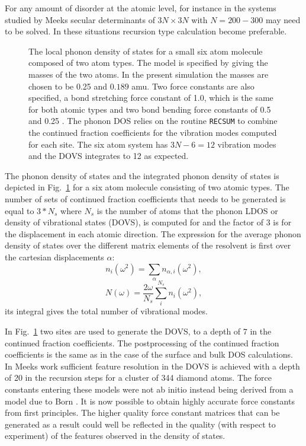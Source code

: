 For any amount of disorder at the atomic level, for instance in the systems 
studied by Meeks secular determinants of $3N\times3N$ with
$N=200-300$ may need to be solved. In these situations recursion 
type calculation become preferable. \cite{dean92}
%
\begin{figure}
\begin{center}
{\graphicspath{{./invariance/rec_examples/phonon/}}}
\caption{The local phonon density of states for a small six atom molecule 
composed of two atom types. The model is specified by giving the 
masses of the two atoms. In the present simulation 
the masses are chosen to be 0.25 and $0.189$ amu. Two force constants are also
specified, a bond stretching force constant of 1.0, 
which is the same for both atomic types
and two bond bending force constants of 0.5 and 0.25 \label{fig:phonondos}. 
The phonon DOS relies on the routine
\texttt{RECSUM} to combine the continued fraction coefficients 
for the vibration modes computed for each site. 
The six atom system has $3N-6=12$ vibration modes and the 
DOVS integrates to 12 as expected.}
\end{center}
\end{figure}
%
The phonon density of states and the integrated phonon density of 
states is depicted in Fig.~\ref{fig:phonondos} 
for a six atom molecule consisting of two atomic types. The number of 
sets of continued fraction coefficients
that needs to be generated is equal to $3*N_{s}$ where $N_{s}$ 
is the number of atoms that the phonon LDOS
or density of vibrational states (DOVS), is computed 
for and the factor of 3 is for the displacement in each 
atomic direction. The expression for the average phonon density of states
over the different matrix elements of the resolvent 
is first over the cartesian displacements $\alpha$:
%
\begin{equation}
n_{i}(\omega^{2}) = \sum_{\alpha}n_{\alpha,i}(\omega^{2}),
\end{equation}
%
\begin{equation}
N(\omega) = \frac{2\omega}{N_{s}}\sum_{i}^{N_{s}}n_{i}(\omega^{2}),
\end{equation}
%
its integral gives the total number of vibrational modes.

In Fig.~\ref{fig:phonondos} two sites are used to generate the 
DOVS, to a depth of $7$ in the continued fraction coefficients. 
The postprocessing of the continued fraction coefficients 
is the same as in the case of the surface and bulk DOS calculations. 
In Meeks work sufficient feature resolution in the DOVS is 
achieved with a depth of 20 in the recursion steps for a 
cluster of 344 diamond atoms. The force constants entering 
these models were not ab initio instead being 
derived from a model due to Born \cite{born14}. 
It is now possible to obtain highly accurate force 
constants from first principles. The higher 
quality force constant matrices that can be generated 
as a result could well be reflected in the quality 
(with respect to experiment) of the features 
observed in the density of states.

